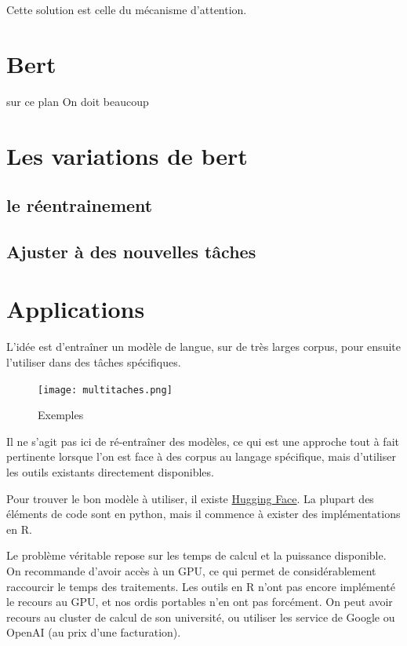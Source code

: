 \documentclass[
  letterpaper,
  DIV=11,
  numbers=noendperiod]{scrreprt}
\begin{document}
Cette solution est celle du mécanisme d'attention.

\section{Bert}\label{bert}

sur ce plan On doit beaucoup

\section{Les variations de bert}\label{les-variations-de-bert}

\subsection{le réentrainement}\label{le-ruxe9entrainement}

\subsection{Ajuster à des nouvelles
tâches}\label{ajuster-uxe0-des-nouvelles-tuxe2ches}

\section{Applications}\label{applications}

L'idée est d'entraîner un modèle de langue, sur de très larges corpus,
pour ensuite l'utiliser dans des tâches spécifiques.

\begin{figure}[H]

{\centering \texttt{[image: multitaches.png]}

}

\caption{Exemples}

\end{figure}%

Il ne s'agit pas ici de ré-entraîner des modèles, ce qui est une
approche tout à fait pertinente lorsque l'on est face à des corpus au
langage spécifique, mais d'utiliser les outils existants directement
disponibles.

Pour trouver le bon modèle à utiliser, il existe
\href{https://huggingface.co/}{Hugging Face}. La plupart des éléments de
code sont en python, mais il commence à exister des implémentations en
R.

Le problème véritable repose sur les temps de calcul et la puissance
disponible. On recommande d'avoir accès à un GPU, ce qui permet de
considérablement raccourcir le temps des traitements. Les outils en R
n'ont pas encore implémenté le recours au GPU, et nos ordis portables
n'en ont pas forcément. On peut avoir recours au cluster de calcul de
son université, ou utiliser les service de Google ou OpenAI (au prix
d'une facturation).
\end{document}
